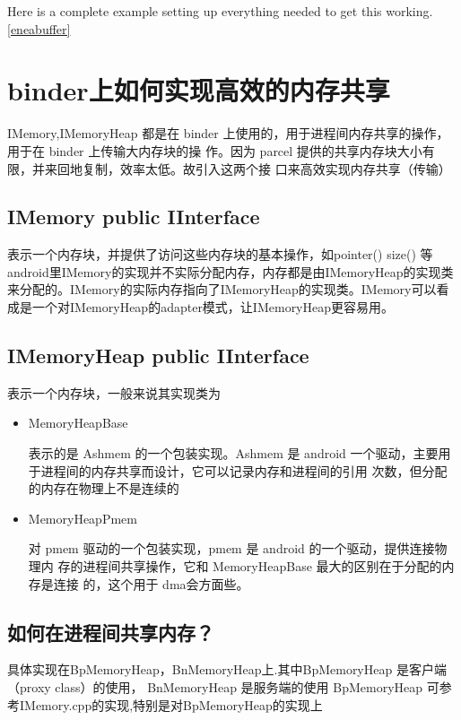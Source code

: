 \documentclass[a4paper,11pt]{article}
\begin{document}
Here is a complete example setting up everything needed to get this working.
\ref{eneabuffer}

\section{binder上如何实现高效的内存共享}
IMemory,IMemoryHeap 都是在 binder 上使用的，用于进程间内存共享的操作，用于在 binder 上传输大内存块的操
作。因为 parcel 提供的共享内存块大小有限，并来回地复制，效率太低。故引入这两个接
口来高效实现内存共享（传输）

\subsection{IMemory public IInterface}
表示一个内存块，并提供了访问这些内存块的基本操作，如pointer() size() 等
android里IMemory的实现并不实际分配内存，内存都是由IMemoryHeap的实现类来分配的。IMemory的实际内存指向了IMemoryHeap的实现类。IMemory可以看成是一个对IMemoryHeap的adapter模式，让IMemoryHeap更容易用。

\subsection{IMemoryHeap public IInterface}
表示一个内存块，一般来说其实现类为
\begin{itemize}
    \item MemoryHeapBase 

        表示的是 Ashmem 的一个包装实现。Ashmem 是 android
        一个驱动，主要用于进程间的内存共享而设计，它可以记录内存和进程间的引用
        次数，但分配的内存在物理上不是连续的

    \item MemoryHeapPmem  

        对 pmem 驱动的一个包装实现，pmem 是 android 的一个驱动，提供连接物理内
        存的进程间共享操作，它和 MemoryHeapBase 最大的区别在于分配的内存是连接
        的，这个用于 dma会方面些。
\end{itemize}
 
\subsection{ 如何在进程间共享内存？}
   具体实现在BpMemoryHeap，BnMemoryHeap上.其中BpMemoryHeap 是客户端（proxy class）的使用，
 BnMemoryHeap 是服务端的使用
  BpMemoryHeap
可参考IMemory.cpp的实现,特别是对BpMemoryHeap的实现上
\end{document}
